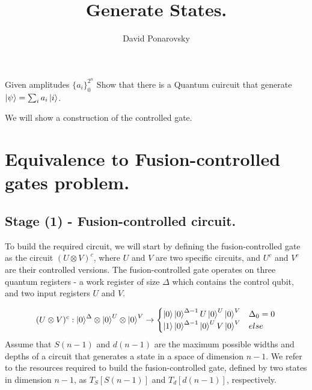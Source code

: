 \documentclass[manuscript,screen,review]{acmart}
\begin{document}


\title{Generate States.} 
\author{David Ponarovsky}

\ifdefined\ACM
\else
  \maketitle
\fi
%
\ifdefined\ACM
  \maketitle
\fi

% 



\begin{problem} Given amplitudes $\{ a_{i} \}_{0}^{2^{n}}$ Show that there is a Quantum cuircuit that generate $\ket{\psi} = \sum_{i}{a_{i}\ket{i}}$.
\end{problem}

We will show a construction of the controlled gate. 

\section{Equivalence to Fusion-controlled gates problem.}
\subsection{Stage (1) - Fusion-controlled circuit.}

To build the required circuit, we will start by defining the fusion-controlled gate as the circuit $(U\otimes V)^{c}$, where $U$ and $V$ are two specific circuits, and $U^{c}$ and $V^{c}$ are their controlled versions. The fusion-controlled gate operates on three quantum registers - a work register of size $\Delta$ which contains the control qubit, and two input registers $U$ and $V$.

\begin{equation*}
  (U\otimes V)^{c} :\ket{0}^{\Delta}\otimes \ket{0}^{U}\otimes \ket{0}^{V}   \rightarrow 
  \begin{cases}
  \ket{0} \ket{0}^{\Delta -1} U\ket{0}^{U} \ket{0}^{V} & \Delta_{0} = 0\\
  \ket{1} \ket{0}^{\Delta -1} \ket{0}^{U} V\ket{0}^{V} & else
\end{cases} 
\end{equation*}
Assume that $S(n-1)$ and $d(n-1)$ are the maximum possible widths and depths of a circuit that generates a state in a space of dimension $n-1$. We refer to the resources required to build the fusion-controlled gate, defined by two states in dimension $n-1$, as $T_{S}[S(n-1)]$ and $T_{d}[d(n-1)]$, respectively.
\end{document}
